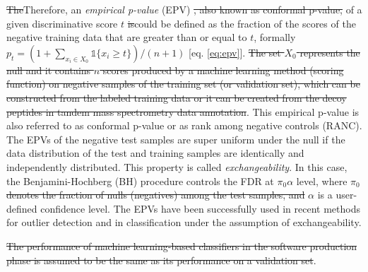\documentclass{article}
\newcommand{\correction}[2]{{\color{red}\sout{#1}}{\color{red}#2}}
\newcommand{\edit}[1]{{\color{red}#1}}
\newcommand{\mathone}{\mathds{1}}
\begin{document}
\correction{The}{Therefore, an} {\em empirical p-value} (EPV) \correction{, also known as conformal p-value,}{} of a given discriminative score $t$ \correction{is}{could be} defined as the fraction of the scores of the negative training data that are greater than or equal to $t$, formally $p_t=(1+\sum_{x_i\in X_0} \mathone\{x_i \ge t\})/(n+1) \label{eq:epv}$ [eq. \ref{eq:epv}]. \correction{The set $X_0$ \edit{represents the null} and it contains $n$ scores produced by a machine learning method (scoring function) on negative samples of the training set (or validation set), which can be constructed from the labeled training data or it can be created from the decoy peptides in tandem mass spectrometry data annotation}{}\cite{elias2007target,danilova2019bias}. \edit{This empirical p-value is also referred to as conformal p-value \cite{bates2023testing} or as rank among negative controls (RANC).}\cite{gao2023simultaneous} The EPVs of the negative test samples are super uniform under the null if the data distribution of the test and training samples are identically and independently distributed. This property is called {\em exchangeability}. In this case, the Benjamini-Hochberg (BH) procedure controls the FDR at $\pi_0\alpha$ level, where \correction{$\pi_0$ denotes the fraction of nulls (negatives) among the test samples, and}{} $\alpha$ is a user-defined confidence level. The EPVs have been successfully used in recent methods for outlier detection \cite{bates2023testing,marandon2023adaptive} and in classification \cite{rava2021burden, angelopoulos2021learn} under the assumption of exchangeability. %


\correction{The performance of machine learning-based classifiers in the software production phase is assumed to be the same as its performance on a validation set}{}\cite{dmlsbook2022}. 
\end{document}
